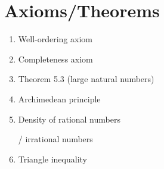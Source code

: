 \documentclass[12pt]{amsart}
\begin{document}
\section*{Axioms/Theorems}

\begin{enumerate}
	\item Well-ordering axiom
	\item Completeness axiom

	\item Theorem 5.3 (large natural numbers)
	\item Archimedean principle
	\item Density of rational numbers

		/ irrational numbers
	\item Triangle inequality
			\begin{comment}
	\item Theorem 12.2 (limits and algebra)
	\item Squeeze Theorem
	\item Monotone convergence theorem
	\item Principle of induction
	\item Theorem 18.6 (convergence and subsequences)
	\item Theorem 19.2 (sequence with subsequences converging to every real number)
	\item Cantor's Theorem

	\item Bolzano-Weierstrass

	\item Main corollary of Bolzano-Weierstrass
	\item Cauchy if and only if convergent

	\item Theorem~25.1 (limits and sequences)
	\item Theorem~26.4 (limits of functions and algebra)
	\item Squeeze Theorem for functions

	\item Theorem~27.5 (continuity and limits)
	
	\item Theorem~28.1 (continuity and algebra)
	\item Theorem~28.3 (continuity and compositions)
		\item Intermediate Value Theorem
	\item Boundedness Theorem
	\item Extreme Value Theorem
	

	\item Derivatives and algebra (Theorem 32.9)
	\item Chain rule (Theorem 33.3)
		\item Min-Max Theorem
	\item Mean Value Theorem
	\item Increasing/decreasing functions and derivatives
\end{comment}
\end{enumerate}
\end{document}
